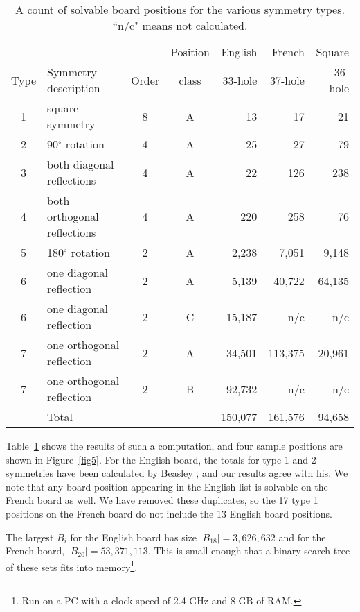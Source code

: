 \documentclass[12pt,reqno]{article}
\begin{document}
\begin{table}[htb]
\begin{center} 
\begin{tabular}{ c  l  c  c  r  r  r }
& & & Position & English & French & Square \\
Type & Symmetry description & Order & class & 33-hole & 37-hole & 36-hole\\
\hline
1 & square symmetry & 8 & A & 13 & 17 & 21 \\
2 & 90$^{\circ}$ rotation & 4 & A & 25 & 27 & 79 \\
3 & both diagonal reflections & 4 & A & 22 & 126 & 238 \\
4 & both orthogonal reflections & 4 & A & 220 & 258 & 76 \\
5 & 180$^{\circ}$ rotation & 2 & A & 2,238 & 7,051 & 9,148 \\
6 & one diagonal reflection & 2 & A & 5,139 & 40,722 & 64,135 \\
6 & one diagonal reflection & 2 & C & 15,187 & n/c & n/c \\
7 & one orthogonal reflection & 2 & A & 34,501 & 113,375 & 20,961 \\
7 & one orthogonal reflection & 2 & B & 92,732 & n/c & n/c \\
\hline
 & Total & & & 150,077 & 161,576 & 94,658 \\
\end{tabular}
\caption{A count of solvable board positions for the various symmetry types.
``n/c" means not calculated.} 
\label{tab2}
\end{center} 
\end{table}

Table~\ref{tab2} shows the results of such a computation, and four sample positions are shown in Figure~\ref{fig5}.
For the English board, the totals for type 1 and 2 symmetries have been calculated by Beasley \cite{Beasley},
and our results agree with his.
We note that any board position appearing in the English list is solvable on the
French board as well.
We have removed these duplicates,
so the 17 type 1 positions on the French board do not include the 13 English board positions.

The largest $B_i$ for the English board has size $|B_{18}| = 3,626,632$ and for the French board,
$|B_{20}| = 53,371,113$.
This is small enough that a binary search tree of these sets fits into
memory\footnote{Run on a PC with a clock speed of 2.4 GHz and 8 GB of RAM.}.
\end{document}
